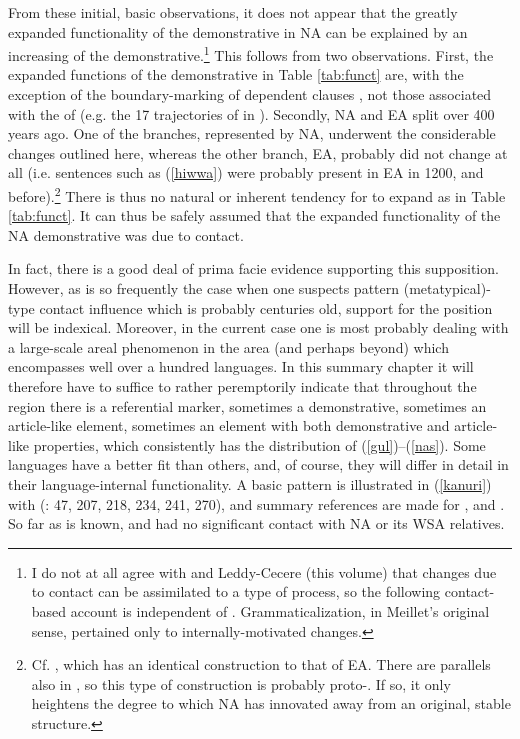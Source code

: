 \documentclass[output=paper]{langsci/langscibook}
\begin{document}
From these initial, basic observations, it does not appear that the greatly expanded functionality of the demonstrative in NA can be explained by an increasing  of the demonstrative.\footnote{I do not at all agree with \citet{HeineKuteva2011} and Leddy-Cecere (this volume) that changes due to contact can be assimilated to a type of  process, so the following contact-based account is independent of . Grammaticalization, in Meillet's original sense, pertained only to internally-motivated changes.} This follows from two observations. First, the expanded functions of the demonstrative in Table \ref{tab:funct} are, with the exception of the boundary-marking of dependent clauses , not those associated with the  of  (e.g. the 17 trajectories of  in \citealt{Diessel1999}). Secondly, NA and EA split over 400 years ago. One of the branches, represented by NA, underwent the considerable changes outlined here, whereas the other branch, EA, probably did not change at all (i.e. sentences such as (\ref{hiwwa}) were probably present in EA in 1200, and before).\footnote{Cf. , which has an identical construction to that of EA. There are parallels also in  , so this type of construction is probably proto-. If so, it only heightens the degree to which NA has innovated away from an original, stable structure.} There is thus no natural or inherent tendency for  to expand as in Table \ref{tab:funct}. It can thus be safely assumed that the expanded functionality of the NA demonstrative was due to contact.

In fact, there is a good deal of prima facie evidence supporting this supposition. However, as is so frequently the case when one suspects pattern (metatypical)-type contact influence which is probably centuries old, support for the position will be indexical. Moreover, in the current case one is most probably dealing with a large-scale areal phenomenon in the  area (and perhaps beyond) which encompasses well over a hundred languages. In this summary chapter it will therefore have to suffice to rather peremptorily indicate that throughout the region there is a referential marker, sometimes a demonstrative, sometimes an article-like element, sometimes an element with both demonstrative and article-like properties, which consistently has the distribution of (\ref{gul})–(\ref{nas}). Some languages have a better fit than others, and, of course, they will differ in detail in their language-internal functionality. A basic pattern is illustrated in (\ref{kanuri}) with  (\citealt{Hutchison1981}: 47, 207, 218, 234, 241, 270), and summary references are made for ,  and . So far as is known,  and  had no significant contact with NA or its WSA relatives.
\end{document}
